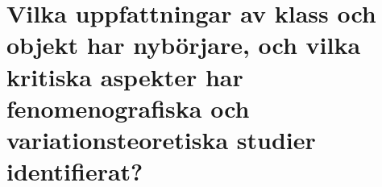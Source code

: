 

\chapter[Hur uppfattar nybörjare klass och objekt?]{Vilka uppfattningar
  av klass och objekt har nybörjare, och vilka kritiska aspekter har
  fenomenografiska och variationsteoretiska studier identifierat?}
\label{app:fenomenografi-klasser}

